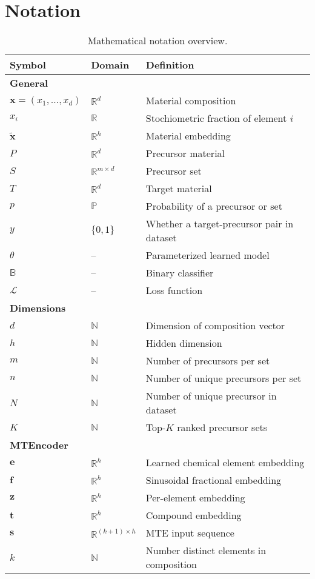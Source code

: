 \appendix
\onecolumn

\section{Notation} \label{app:notation}

\begin{table}[htb]
\centering
\caption{Mathematical notation overview.}
\label{tab:notation}
\begin{tabular}{lll}
\toprule

Symbol & Domain & Definition \\
\hline
\multicolumn{3}{l}{\textbf{General}} \\
$\mathbf{x} = (x_1, \dots, x_d)$ & $\mathbb{R}^d$ & Material composition \\
$x_i$ & $\mathbb{R}$ & Stochiometric fraction of element $i$ \\
$\tilde{\mathbf{x}}$ & $\mathbb{R}^{h}$ & Material embedding \\
$\textit{P}$ & $\mathbb{R}^{d}$ & Precursor material \\
$\textit{S}$ & $\mathbb{R}^{m\times d}$ & Precursor set \\
$\textit{T}$ & $\mathbb{R}^{d}$ & Target material \\
$p$ & $\mathbb{P}$ & Probability of a precursor or set \\
$y$ & $\{0,1\}$ & Whether a target-precursor pair in dataset \\
$\theta$ & -- & Parameterized learned model \\
$\mathbb{B}$ & -- & Binary classifier \\
$\mathcal{L}$ & -- & Loss function \\
\hline
\multicolumn{3}{l}{\textbf{Dimensions}} \\
$d$ & $\mathbb{N}$ & Dimension of composition vector \\
$h$ & $\mathbb{N}$ & Hidden dimension \\
$m$ & $\mathbb{N}$ & Number of precursors per set \\
$n$ & $\mathbb{N}$ & Number of unique precursors per set \\
$N$ & $\mathbb{N}$ & Number of unique precursor in dataset \\
$K$ & $\mathbb{N}$ & Top-$K$ ranked precursor sets \\
\hline
\multicolumn{3}{l}{\textbf{MTEncoder}} \\
$\mathbf{e}$ & $\mathbb{R}^{h}$ & Learned chemical element embedding \\
$\mathbf{f}$ & $\mathbb{R}^{h}$ & Sinusoidal fractional embedding \\
$\mathbf{z}$ & $\mathbb{R}^{h}$ & Per-element embedding \\
$\mathbf{t}$ & $\mathbb{R}^{h}$ & Compound embedding \\
$\mathbf{s}$ & $\mathbb{R}^{(k+1) \times h}$ & MTE input sequence \\
$k$ & $\mathbb{N}$ & Number distinct elements in composition \\
\bottomrule
\end{tabular}
\end{table}
